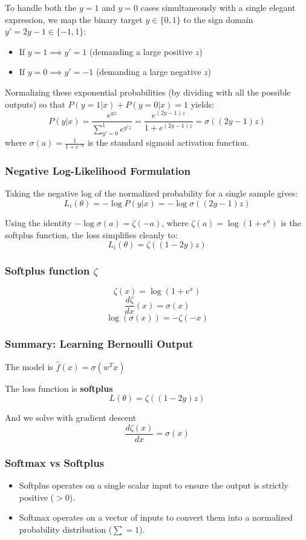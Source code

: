 \documentclass{article}
\begin{document}
To handle both the $y=1$ and $y=0$ cases simultaneously with a single elegant expression, we map the binary target $y \in \{0,1\}$ to the sign domain $y' = 2y - 1 \in \{-1, 1\}$:
\begin{itemize}
    \item If $y = 1 \implies y' = 1$ (demanding a large positive $z$)
    \item If $y = 0 \implies y' = -1$ (demanding a large negative $z$)
\end{itemize}

Normalizing these exponential probabilities (by dividing with all the possible outputs) so that $P(y=1|x) + P(y=0|x) = 1$ yields:
\[P(y|x) = \frac{e^{yz}}{\sum_{y'=0}^1 e^{y'z}} = \frac{e^{(2y-1)z}}{1 + e^{(2y-1)z}} = \sigma((2y-1)z)\]
where $\sigma(a) = \frac{1}{1+e^{-a}}$ is the standard sigmoid activation function.
\subsubsection{Negative Log-Likelihood Formulation}
Taking the negative log of the normalized probability for a single sample gives:
\[L_i(\theta) = -\log P(y|x) = -\log \sigma((2y-1)z)\]

Using the identity $-\log \sigma(a) = \zeta(-a)$, where $\zeta(a) = \log(1 + e^a)$ is the softplus function, the loss simplifies cleanly to:
\[L_i(\theta) = \zeta((1-2y)z)\]
\subsubsection{Softplus function $\zeta$}
\[\zeta(x) = \log(1+e^x)\]
\[\frac{d\zeta}{dx}(x) = \sigma(x)\]
\[\log(\sigma(x)) = -\zeta(-x)\]

\subsubsection{Summary: Learning Bernoulli Output}
The model is $\hat{f}(x) = \sigma(w^T x)$

The loss function is \textbf{softplus}
\[L(\theta) = \zeta((1-2y)z)\]

And we solve with gradient descent
\[\frac{d\zeta(x)}{dx} = \sigma(x)\]

\subsubsection{Softmax vs Softplus}
\begin{itemize}
  \item Softplus operates on a single scalar input to ensure the output is strictly positive ($>0$).
  \item Softmax operates on a vector of inputs to convert them into a normalized probability distribution ($\sum = 1$).
\end{itemize}
\end{document}

